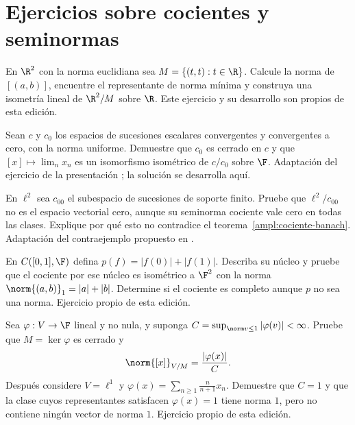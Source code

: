 \section{Ejercicios sobre cocientes y seminormas}

\begin{ejercicio}\label{ej:ampl-cocientes-1}
En $\R^2$ con la norma euclidiana sea $M=\{(t,t):t\in\R\}$. Calcule la norma de $[(a,b)]$, encuentre el representante de norma mínima y construya una isometría lineal de $\R^2/M$ sobre $\R$. Este ejercicio y su desarrollo son propios de esta edición.
\end{ejercicio}


\begin{ejercicio}\label{ej:ampl-cocientes-2}
Sean $c$ y $c_0$ los espacios de sucesiones escalares convergentes y convergentes a cero, con la norma uniforme. Demuestre que $c_0$ es cerrado en $c$ y que $[x]\mapsto\lim_nx_n$ es un isomorfismo isométrico de $c/c_0$ sobre $\F$. Adaptación del ejercicio de la presentación \cite{max-seminormado}; la solución se desarrolla aquí.
\end{ejercicio}


\begin{ejercicio}\label{ej:ampl-cocientes-3}
En $\ell^2$ sea $c_{00}$ el subespacio de sucesiones de soporte finito. Pruebe que $\ell^2/c_{00}$ no es el espacio vectorial cero, aunque su seminorma cociente vale cero en todas las clases. Explique por qué esto no contradice el teorema~\ref{ampl:cociente-banach}. Adaptación del contraejemplo propuesto en \cite{max-seminormado}.
\end{ejercicio}


\begin{ejercicio}\label{ej:ampl-cocientes-4}
En $C([0,1],\F)$ defina $p(f)=|f(0)|+|f(1)|$. Describa su núcleo y pruebe que el cociente por ese núcleo es isométrico a $\F^2$ con la norma $\norm{(a,b)}_1=|a|+|b|$. Determine si el cociente es completo aunque $p$ no sea una norma. Ejercicio propio de esta edición.
\end{ejercicio}


\begin{ejercicio}\label{ej:ampl-cocientes-5}
Sea $\varphi:V\to\F$ lineal y no nula, y suponga
$C=\sup_{\norm v\le1}|\varphi(v)|<\infty$. Pruebe que $M=\ker\varphi$ es cerrado y
\[
 \norm{[x]}_{V/M}=\frac{|\varphi(x)|}{C}.
\]
Después considere $V=\ell^1$ y $\varphi(x)=\sum_{n\ge1}\frac{n}{n+1}x_n$. Demuestre que $C=1$ y que la clase cuyos representantes satisfacen $\varphi(x)=1$ tiene norma $1$, pero no contiene ningún vector de norma $1$. Ejercicio propio de esta edición.
\end{ejercicio}


